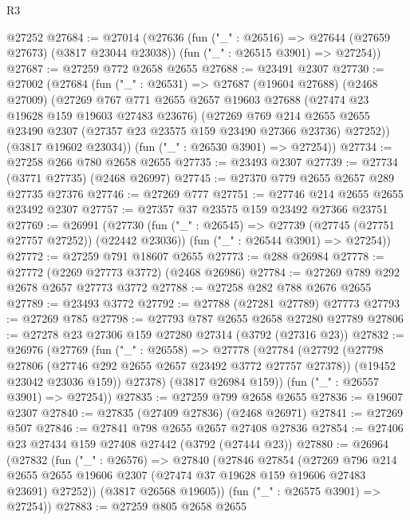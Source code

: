 \begin{lexlean}{R3}
\begin{coremodule}
    @27252
@27684 := @27014
    (@27636
      (fun ("_" : @26516) => @27644 (@27659 @27673) (@3817 @23044 @23038))
      (fun ("_" : @26515 @3901) => @27254))
@27687 := @27259 @772 @2658 @2655
@27688 := @23491 @2307
@27730 := @27002
    (@27684
      (fun ("_" : @26531) =>
      @27687
        (@19604 @27688)
        (@2468 @27009)
        (@27269
          @767
          @771
          @2655
          @2657
          @19603
          @27688
          (@27474 @23 @19628 @159 @19603 @27483 @23676)
          (@27269
            @769
            @214
            @2655
            @2655
            @23490
            @2307
            (@27357 @23 @23575 @159 @23490 @27366 @23736)
            @27252))
        (@3817 @19602 @23034))
      (fun ("_" : @26530 @3901) => @27254))
@27734 := @27258 @266 @780 @2658 @2655
@27735 := @23493 @2307
@27739 := @27734 (@3771 @27735) (@2468 @26997)
@27745 := @27370 @779 @2655 @2657 @289 @27735 @27376
@27746 := @27269 @777
@27751 := @27746 @214 @2655 @2655 @23492 @2307
@27757 := @27357 @37 @23575 @159 @23492 @27366 @23751
@27769 := @26991
    (@27730
      (fun ("_" : @26545) => @27739 (@27745 (@27751 @27757 @27252)) (@22442 @23036))
      (fun ("_" : @26544 @3901) => @27254))
@27772 := @27259 @791 @18607 @2655
@27773 := @288 @26984
@27778 := @27772 (@2269 @27773 @3772) (@2468 @26986)
@27784 := @27269 @789 @292 @2678 @2657 @27773 @3772
@27788 := @27258 @282 @788 @2676 @2655
@27789 := @23493 @3772
@27792 := @27788 (@27281 @27789) @27773
@27793 := @27269 @785
@27798 := @27793 @787 @2655 @2658 @27280 @27789
@27806 := @27278 @23 @27306 @159 @27280 @27314 (@3792 (@27316 @23))
@27832 := @26976
    (@27769
      (fun ("_" : @26558) =>
      @27778
        (@27784
          (@27792
            (@27798 @27806 (@27746 @292 @2655 @2657 @23492 @3772 @27757 @27378))
            (@19452 @23042 @23036 @159))
          @27378)
        (@3817 @26984 @159))
      (fun ("_" : @26557 @3901) => @27254))
@27835 := @27259 @799 @2658 @2655
@27836 := @19607 @2307
@27840 := @27835 (@27409 @27836) (@2468 @26971)
@27841 := @27269 @507
@27846 := @27841 @798 @2655 @2657 @27408 @27836
@27854 := @27406 @23 @27434 @159 @27408 @27442 (@3792 (@27444 @23))
@27880 := @26964
    (@27832
      (fun ("_" : @26576) =>
      @27840
        (@27846
          @27854
          (@27269
            @796
            @214
            @2655
            @2655
            @19606
            @2307
            (@27474 @37 @19628 @159 @19606 @27483 @23691)
            @27252))
        (@3817 @26568 @19605))
      (fun ("_" : @26575 @3901) => @27254))
@27883 := @27259 @805 @2658 @2655

\end{coremodule}
\end{lexlean}
